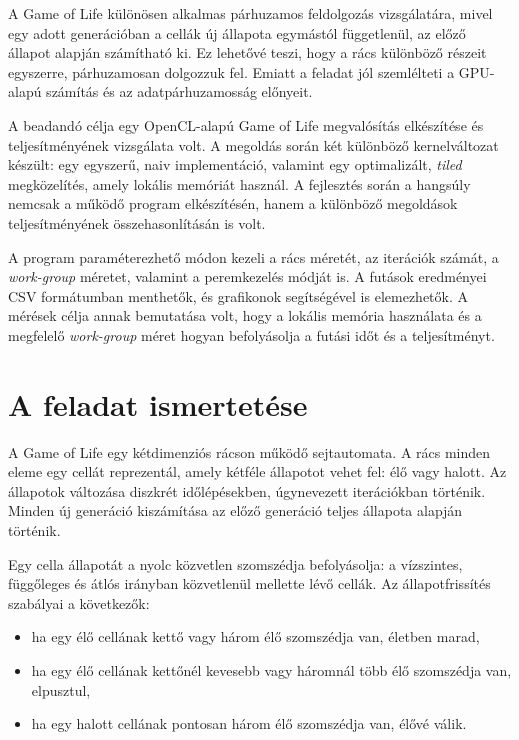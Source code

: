 \documentclass[12pt,a4paper]{article}
\begin{document}
A Game of Life különösen alkalmas párhuzamos feldolgozás vizsgálatára, mivel egy adott generációban a cellák új állapota egymástól függetlenül, az előző állapot alapján számítható ki. Ez lehetővé teszi, hogy a rács különböző részeit egyszerre, párhuzamosan dolgozzuk fel. Emiatt a feladat jól szemlélteti a GPU-alapú számítás és az adatpárhuzamosság előnyeit.

A beadandó célja egy OpenCL-alapú Game of Life megvalósítás elkészítése és teljesítményének vizsgálata volt. A megoldás során két különböző kernelváltozat készült: egy egyszerű, naiv implementáció, valamint egy optimalizált, \emph{tiled} megközelítés, amely lokális memóriát használ. A fejlesztés során a hangsúly nemcsak a működő program elkészítésén, hanem a különböző megoldások teljesítményének összehasonlításán is volt.

A program paraméterezhető módon kezeli a rács méretét, az iterációk számát, a \emph{work-group} méretet, valamint a peremkezelés módját is. A futások eredményei CSV formátumban menthetők, és grafikonok segítségével is elemezhetők. A mérések célja annak bemutatása volt, hogy a lokális memória használata és a megfelelő \emph{work-group} méret hogyan befolyásolja a futási időt és a teljesítményt.

\section{A feladat ismertetése}

A Game of Life egy kétdimenziós rácson működő sejtautomata. A rács minden eleme egy cellát reprezentál, amely kétféle állapotot vehet fel: élő vagy halott. Az állapotok változása diszkrét időlépésekben, úgynevezett iterációkban történik. Minden új generáció kiszámítása az előző generáció teljes állapota alapján történik.

Egy cella állapotát a nyolc közvetlen szomszédja befolyásolja: a vízszintes, függőleges és átlós irányban közvetlenül mellette lévő cellák. Az állapotfrissítés szabályai a következők:

\begin{itemize}
    \item ha egy élő cellának kettő vagy három élő szomszédja van, életben marad,
    \item ha egy élő cellának kettőnél kevesebb vagy háromnál több élő szomszédja van, elpusztul,
    \item ha egy halott cellának pontosan három élő szomszédja van, élővé válik.
\end{itemize}
\end{document}
